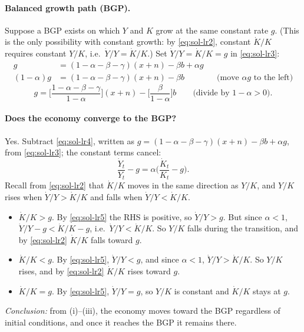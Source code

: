 \paragraph{Balanced growth path (BGP).} Suppose a BGP exists on which $Y$ and $K$ grow at the same constant rate $g$. (This is the only possibility with constant growth: by \eqref{eq:sol-lr2}, constant $\dot K/K$ requires constant $Y/K$, i.e.\ $\dot Y/Y=\dot K/K$.) Set $\dot Y/Y=\dot K/K=g$ in \eqref{eq:sol-lr3}:
\begin{align*}
g&=(1-\alpha-\beta-\gamma)(x+n)-\beta b+\alpha g\\
(1-\alpha)g&=(1-\alpha-\beta-\gamma)(x+n)-\beta b && \text{(move $\alpha g$ to the left)}
\end{align*}
\begin{equation}\label{eq:sol-lr4}
g=\Big[\frac{1-\alpha-\beta-\gamma}{1-\alpha}\Big](x+n)-\Big[\frac{\beta}{1-\alpha}\Big]b \qquad\text{(divide by $1-\alpha>0$)}.
\end{equation}

\paragraph{Does the economy converge to the BGP?} Yes. Subtract \eqref{eq:sol-lr4}, written as $g=(1-\alpha-\beta-\gamma)(x+n)-\beta b+\alpha g$, from \eqref{eq:sol-lr3}; the constant terms cancel:
\begin{equation}\label{eq:sol-lr5}
\frac{\dot Y_t}{Y_t}-g=\alpha\Big(\frac{\dot K_t}{K_t}-g\Big).
\end{equation}
Recall from \eqref{eq:sol-lr2} that $\dot K/K$ moves in the same direction as $Y/K$, and $Y/K$ rises when $\dot Y/Y>\dot K/K$ and falls when $\dot Y/Y<\dot K/K$.
\begin{itemize}
  \item[(i)] $\dot K/K>g$. By \eqref{eq:sol-lr5} the RHS is positive, so $\dot Y/Y>g$. But since $\alpha<1$, $\dot Y/Y-g<\dot K/K-g$, i.e.\ $\dot Y/Y<\dot K/K$. So $Y/K$ falls during the transition, and by \eqref{eq:sol-lr2} $\dot K/K$ falls toward $g$.
  \item[(ii)] $\dot K/K<g$. By \eqref{eq:sol-lr5}, $\dot Y/Y<g$, and since $\alpha<1$, $\dot Y/Y>\dot K/K$. So $Y/K$ rises, and by \eqref{eq:sol-lr2} $\dot K/K$ rises toward $g$.
  \item[(iii)] $\dot K/K=g$. By \eqref{eq:sol-lr5}, $\dot Y/Y=g$, so $Y/K$ is constant and $\dot K/K$ stays at $g$.
\end{itemize}
\textit{Conclusion:} from (i)--(iii), the economy moves toward the BGP regardless of initial conditions, and once it reaches the BGP it remains there.

